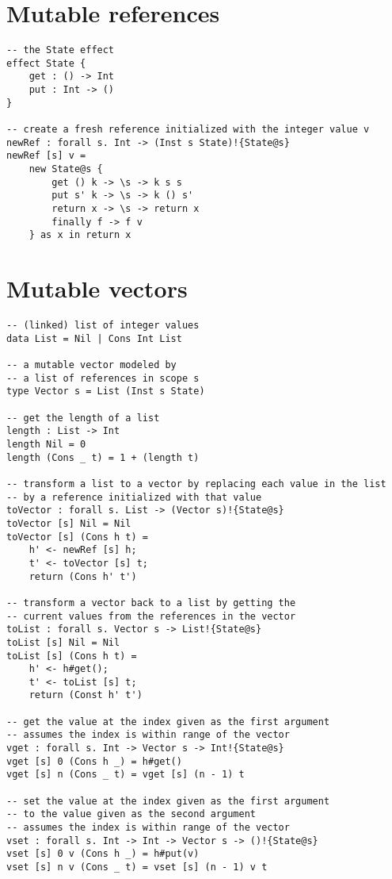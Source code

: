 \iffalse
\fi

\section{Mutable references}
\begin{verbatim}
-- the State effect
effect State {
	get : () -> Int
	put : Int -> ()
}

-- create a fresh reference initialized with the integer value v
newRef : forall s. Int -> (Inst s State)!{State@s}
newRef [s] v =
	new State@s {
		get () k -> \s -> k s s
		put s' k -> \s -> k () s'
		return x -> \s -> return x
		finally f -> f v
	} as x in return x
\end{verbatim}

\section{Mutable vectors}
\begin{verbatim}
-- (linked) list of integer values
data List = Nil | Cons Int List

-- a mutable vector modeled by
-- a list of references in scope s
type Vector s = List (Inst s State)

-- get the length of a list
length : List -> Int
length Nil = 0
length (Cons _ t) = 1 + (length t)

-- transform a list to a vector by replacing each value in the list
-- by a reference initialized with that value
toVector : forall s. List -> (Vector s)!{State@s}
toVector [s] Nil = Nil
toVector [s] (Cons h t) =
	h' <- newRef [s] h;
	t' <- toVector [s] t;
	return (Cons h' t')

-- transform a vector back to a list by getting the
-- current values from the references in the vector
toList : forall s. Vector s -> List!{State@s}
toList [s] Nil = Nil
toList [s] (Cons h t) =
	h' <- h#get();
	t' <- toList [s] t;
	return (Const h' t')

-- get the value at the index given as the first argument
-- assumes the index is within range of the vector
vget : forall s. Int -> Vector s -> Int!{State@s}
vget [s] 0 (Cons h _) = h#get()
vget [s] n (Cons _ t) = vget [s] (n - 1) t

-- set the value at the index given as the first argument
-- to the value given as the second argument
-- assumes the index is within range of the vector
vset : forall s. Int -> Int -> Vector s -> ()!{State@s}
vset [s] 0 v (Cons h _) = h#put(v)
vset [s] n v (Cons _ t) = vset [s] (n - 1) v t
\end{verbatim}


